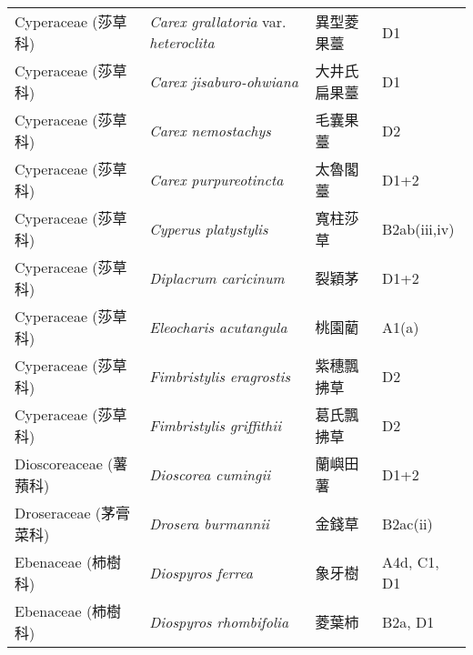 \begin{longtable}{p{3cm}p{5cm}p{3cm}p{4cm}}
    Cyperaceae (莎草科) & \textit{Carex grallatoria} var. \textit{heteroclita}  & 異型菱果薹 & D1 \index{Carex@\textit{Carex}!grallatoria@\textit{grallatoria}!var. heteroclita@var. \textit{heteroclita}}  \index{異型菱果薹} \\
    Cyperaceae (莎草科) & \textit{Carex jisaburo-ohwiana}  & 大井氏扁果薹 & D1 \index{Carex@\textit{Carex}!jisaburo-ohwiana@\textit{jisaburo-ohwiana}}  \index{大井氏扁果薹} \\
    Cyperaceae (莎草科) & \textit{Carex nemostachys}  & 毛囊果薹 & D2 \index{Carex@\textit{Carex}!nemostachys@\textit{nemostachys}}  \index{毛囊果薹} \\
    Cyperaceae (莎草科) & \textit{Carex purpureotincta}  & 太魯閣薹 & D1+2 \index{Carex@\textit{Carex}!purpureotincta@\textit{purpureotincta}}  \index{太魯閣薹} \\
    Cyperaceae (莎草科) & \textit{Cyperus platystylis}  & 寬柱莎草 & B2ab(iii,iv) \index{Cyperus@\textit{Cyperus}!platystylis@\textit{platystylis}}  \index{寬柱莎草} \\
    Cyperaceae (莎草科) & \textit{Diplacrum caricinum}  & 裂穎茅 & D1+2 \index{Diplacrum@\textit{Diplacrum}!caricinum@\textit{caricinum}}  \index{裂穎茅} \\
    Cyperaceae (莎草科) & \textit{Eleocharis acutangula}  & 桃園藺 & A1(a) \index{Eleocharis@\textit{Eleocharis}!acutangula@\textit{acutangula}}  \index{桃園藺} \\
    Cyperaceae (莎草科) & \textit{Fimbristylis eragrostis}  & 紫穗飄拂草 & D2 \index{Fimbristylis@\textit{Fimbristylis}!eragrostis@\textit{eragrostis}}  \index{紫穗飄拂草} \\
    Cyperaceae (莎草科) & \textit{Fimbristylis griffithii}  & 葛氏飄拂草 & D2 \index{Fimbristylis@\textit{Fimbristylis}!griffithii@\textit{griffithii}}  \index{葛氏飄拂草} \\
    Dioscoreaceae (薯蕷科) & \textit{Dioscorea cumingii}  & 蘭嶼田薯 & D1+2 \index{Dioscorea@\textit{Dioscorea}!cumingii@\textit{cumingii}}  \index{蘭嶼田薯} \\
    Droseraceae (茅膏菜科) & \textit{Drosera burmannii}  & 金錢草 & B2ac(ii) \index{Drosera@\textit{Drosera}!burmannii@\textit{burmannii}}  \index{金錢草} \\
    Ebenaceae (柿樹科) & \textit{Diospyros ferrea}  & 象牙樹 & A4d, C1, D1 \index{Diospyros@\textit{Diospyros}!ferrea@\textit{ferrea}}  \index{象牙樹} \\
    Ebenaceae (柿樹科) & \textit{Diospyros rhombifolia}  & 菱葉柿 & B2a, D1 \index{Diospyros@\textit{Diospyros}!rhombifolia@\textit{rhombifolia}}  \index{菱葉柿} \\

\end{longtable}
